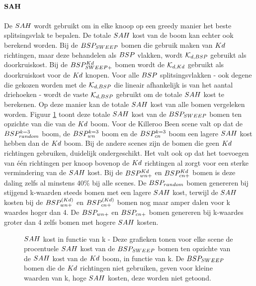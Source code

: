 \paragraph{$\mathbf{SAH}$}
De $\symSAH$ wordt gebruikt om in elke knoop op een greedy manier het beste splitsingsvlak te bepalen. De totale $\symSAH$ kost van de boom kan echter ook berekend worden. Bij de $BSP_{SWEEP}$ bomen die gebruik maken van $Kd$ richtingen, maar deze behandelen als $BSP$ vlakken, wordt $\mathcal{K}_{d,BSP}$ gebruikt als doorkruiskost. Bij de $BSP^{Kd}_{SWEEP+}$ bomen wordt de $\mathcal{K}_{d,Kd}$ gebruikt als doorkruiskost voor de $Kd$ knopen. Voor alle $BSP$ splitsingsvlakken - ook degene die gekozen worden met de $\mathcal{K}_{d,BSP}$ die lineair afhankelijk is van het aantal driehoeken - wordt de vaste $\mathcal{K}_{d,BSP}$ gebruikt om de totale $\symSAH$ kost te berekenen.
Op deze manier kan de totale $\symSAH$ kost van alle bomen vergeleken worden.
Figuur \ref{fig:k-sah} toont deze totale $\symSAH$ kost van de $BSP_{SWEEP}$ bomen ten opzichte van die van de $Kd$ boom. 
Voor de Killeroo Been scene valt op dat de $BSP_{random}^{k=3}$ boom, de $BSP_{wn}^{k=3}$ boom en de $BSP_{cn}^{k=3}$ boom een lagere $\symSAH$ kost hebben dan de $Kd$ boom.
Bij de andere scenes zijn de bomen die geen $Kd$ richtingen gebruiken, duidelijk ondergeschikt.
Het valt ook op dat het toevoegen van één richtingen per knoop bovenop de $Kd$ richtingen al zorgt voor een sterke vermindering van de $\symSAH$ kost.
Bij de $BSP^{Kd}_{wn+}$ en $BSP^{Kd}_{cn+}$ bomen is deze daling zelfs al minstens 40\% bij alle scenes.
De $BSP_{random}$ bomen genereren bij stijgend k-waarden steeds bomen met een lagere $\symSAH$ kost, terwijl de $\symSAH$ kosten bij de $BSP^{(Kd)}_{wn+}$ en $BSP^{(Kd)}_{cn+}$ bomen nog maar amper dalen voor k waardes hoger dan 4. De $BSP_{wn+}$ en $BSP_{cn+}$ bomen genereren bij k-waardes groter dan 4 zelfs bomen met hogere $\symSAH$ kosten. 
\begin{figure}[h]
  \centering
  \begin{subfigure}[t]{.32\linewidth}
    \centering
{}
  \end{subfigure}
  \begin{subfigure}[t]{.32\linewidth}
    \centering
{}
\end{subfigure}
\begin{subfigure}[t]{.32\linewidth}
  \centering
{}
\end{subfigure}
\caption[$\symSAH$ kost in functie van k]{$\symSAH$ kost in functie van k - \small Deze grafieken tonen voor elke scene de procentuele $\symSAH$ kost van de $BSP_{SWEEP}$ bomen ten opzichte van de $\symSAH$ kost van de $Kd$ boom, in functie van k. De $BSP_{SWEEP}$ bomen die de $Kd$ richtingen niet gebruiken, geven voor kleine waarden van k, hoge $\symSAH$ kosten, deze worden niet getoond.}
\label{fig:k-sah}
\end{figure}

